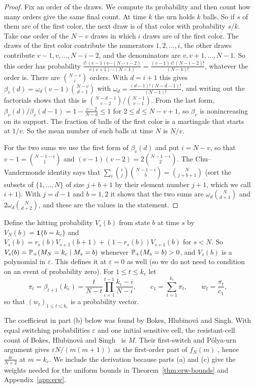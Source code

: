 \begin{proof}
Fix an order of the draws. We compute its probability and then
count how many orders give the same final count.
At time $k$ the urn holds $k$ balls. So if $s$ of them are of the first
color, the next draw is of that color with probability $s/k$. Take one order
of the $N-v$ draws in which $i$ draws are of the first color. The draws of
the first color contribute the numerators $1,2,\dots,i$, the other draws
contribute $v-1,v,\dots,N-i-2$, and the denominators are $v,v+1,\dots,N-1$.
So this order has probability
$\frac{i!\,(v-1)v\cdots(N-i-2)}{v(v+1)\cdots(N-1)}=\frac{(v-1)\,i!\,(N-i-2)!}{(N-1)!}$,
whatever the order is. There are $\binom{N-v}{i}$ orders. With $d=i+1$ this
gives $\beta_v(d)=\omega_d(v-1)\binom{N-v}{d-1}$ with
$\omega_d=\frac{(d-1)!(N-d-1)!}{(N-1)!}$, and writing out the factorials shows
that this is $\binom{N-d-1}{v-2}/\binom{N-1}{v-1}$. From the last form,
$\beta_v(d)/\beta_v(d-1)=1-\frac{v-2}{N-d}\le1$ for $2\le d\le N-v+1$, so
$\beta_v$ is nonincreasing on its support. The fraction of balls of the first color is a
martingale that starts at $1/v$. So the mean number of such balls at time
$N$ is $N/v$.

For the two sums we use the first form of $\beta_v(d)$ and put $i=N-v$, so
that $v-1=\binom{N-1-i}1$ and $(v-1)(v-2)=2\binom{N-1-i}2$. The
Chu--Vandermonde identity says that
$\sum_i\binom ij\binom{N-1-i}b=\binom N{j+b+1}$ (sort the subsets of
$\{1,\dots,N\}$ of size $j+b+1$ by their element number $j+1$, which we call
$i+1$). With $j=d-1$ and $b=1,2$ it shows that the two sums are
$\omega_d\binom N{d+1}$ and $2\omega_d\binom N{d+2}$, and these are the values in the
statement.
\end{proof}

Define the hitting probability $V_s(b)$ from state $b$ at time $s$ by
$V_N(b)=\mathbf 1\{b={k_{\mathrm c}}\}$ and
$V_s(b)=r_s(b)V_{s+1}(b+1)+(1-r_s(b))V_{s+1}(b)$ for $s<N$. So
$V_s(b)=\mathbb{P}_+(M_N={k_{\mathrm c}}\mid M_s=b)$ whenever $\mathbb{P}_+(M_s=b)>0$, and $V_s(b)$
is a polynomial in $\varepsilon$. This defines it at $\varepsilon=0$ as well (so we do not need to
condition on an event of probability zero).
For $1\le t\le {k_{\mathrm c}}$
let
\[
 \pi_t=\beta_{t+1}({k_{\mathrm c}})=\frac t{N-t}\prod_{i=1}^{t-1}\frac{{k_{\mathrm c}}-i}{N-i},\qquad
 c_1=\sum_{t=1}^{k_{\mathrm c}}\pi_t,\qquad w_t=\frac{\pi_t}{c_1},
\]
so that $(w_t)_{1\le t\le {k_{\mathrm c}}}$ is a probability vector.

The coefficient in part (b) below was found by Bokes, Hlubinov\'a
and Singh. With equal switching
probabilities $\varepsilon$ and one initial sensitive cell, the resistant-cell
count of Bokes, Hlubinov\'a and Singh~\cite[Section~2 and Eq.~(1)]{bhs2023}
is $M$. Their first-switch and P\'olya-urn argument gives
$\varepsilon N/(m(m+1))$ as the first-order part of $f_N(m)$
\cite[Eqs.~(6)--(10)]{bhs2023}, hence $\frac{4\varepsilon}{N+2}$ at $m={k_{\mathrm c}}$.
We include the derivation because parts (a) and (c) give the weights
needed for the uniform bounds in Theorem~\ref{thm:erw-bounds} and
Appendix~\ref{app:erw}.

